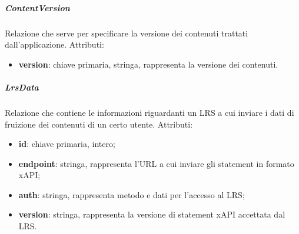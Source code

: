 \documentclass[../Tesi.tex]{subfiles}
\begin{document}
				\subparagraph*{ContentVersion}
				Relazione che serve per specificare la versione dei contenuti trattati dall'applicazione. Attributi:
				\begin{itemize}
					\item \textbf{version}: chiave primaria, stringa, rappresenta la versione dei contenuti.
				\end{itemize}

				\subparagraph*{LrsData}
				Relazione che contiene le informazioni riguardanti un LRS a cui inviare i dati di fruizione dei contenuti di un certo utente. Attributi:
				\begin{itemize}
					\item \textbf{id}: chiave primaria, intero;
					\item \textbf{endpoint}: stringa, rappresenta l'URL a cui inviare gli statement in formato xAPI;
					\item \textbf{auth}: stringa, rappresenta metodo e dati per l'accesso al LRS;
					\item \textbf{version}: stringa, rappresenta la versione di statement xAPI accettata dal LRS.
				\end{itemize}
\end{document}
